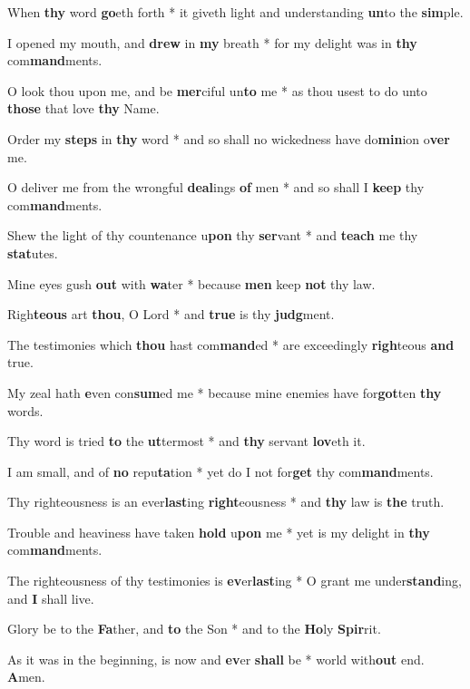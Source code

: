 \begin{multicols}{2}
	When \textbf{thy} word \textbf{go}eth forth * it giveth light and understanding \textbf{un}to the \textbf{sim}ple.
	
	I opened my mouth, and \textbf{drew} in \textbf{my} breath * for my delight was in \textbf{thy} com\textbf{mand}ments.
	
	O look thou upon me, and be \textbf{mer}ciful un\textbf{to} me * as thou usest to do unto \textbf{those} that love \textbf{thy} Name.
	
	Order my \textbf{steps} in \textbf{thy} word * and so shall no wickedness have do\textbf{min}ion o\textbf{ver} me.
	
	O deliver me from the wrongful \textbf{deal}ings \textbf{of} men * and so shall I \textbf{keep} thy com\textbf{mand}ments.
	
	Shew the light of thy countenance u\textbf{pon} thy \textbf{ser}vant * and \textbf{teach} me thy \textbf{stat}utes.
	
	Mine eyes gush \textbf{out} with \textbf{wa}ter * because \textbf{men} keep \textbf{not} thy law.
	
	Righ\textbf{teous} art \textbf{thou}, O Lord * and \textbf{true} is thy \textbf{judg}ment.
	
	The testimonies which \textbf{thou} hast com\textbf{mand}ed * are exceedingly \textbf{righ}teous \textbf{and} true.
	
	My zeal hath \textbf{e}ven con\textbf{sum}ed me * because mine enemies have for\textbf{got}ten \textbf{thy} words.
	
	Thy word is tried \textbf{to} the \textbf{ut}termost * and \textbf{thy} servant \textbf{lov}eth it.
	
	I am small, and of \textbf{no} repu\textbf{ta}tion * yet do I not for\textbf{get} thy com\textbf{mand}ments.
	
	Thy righteousness is an ever\textbf{last}ing \textbf{right}eousness * and \textbf{thy} law is \textbf{the} truth.
	
	Trouble and heaviness have taken \textbf{hold} u\textbf{pon} me * yet is my delight in \textbf{thy} com\textbf{mand}ments.
	
	The righteousness of thy testimonies is \textbf{ev}er\textbf{last}ing * O grant me under\textbf{stand}ing, and \textbf{I} shall live.
	
	Glory be to the \textbf{Fa}ther, and \textbf{to} the Son * and to the \textbf{Ho}ly \textbf{Spir}rit.
	
	As it was in the beginning, is now and \textbf{ev}er \textbf{shall} be * world with\textbf{out} end. \textbf{A}men.
\end{multicols}